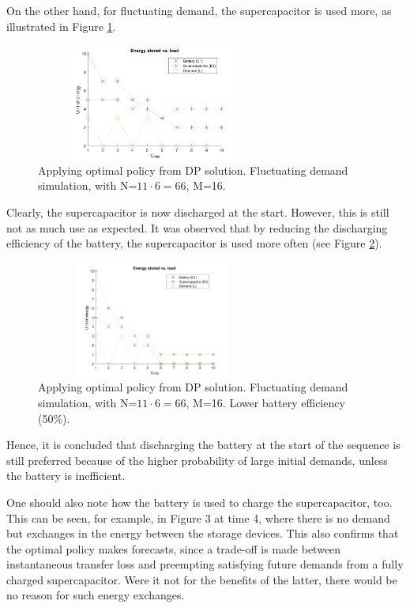 \documentclass[conference]{IEEEtran}
\begin{document}
On the other hand, for fluctuating demand, the supercapacitor is used more, as illustrated in Figure \ref{fig:FluctuatingDemand}.
\begin{figure}[htbp]
\centerline{\includegraphics[width=3in,height=1.5in]{EnergyStoredvsFluctuatingLoad(E1=10,E2=5).jpg}}
\caption{Applying optimal policy from DP solution. Fluctuating demand simulation, with N=$11\cdot6=66$, M=16.}
\label{fig:FluctuatingDemand}
\end{figure} Clearly, the supercapacitor is now discharged at the start. However, this is still not as much use as expected. It was observed that by reducing the discharging efficiency of the battery, the supercapacitor is used more often (see Figure \ref{fig:FluctuatingDemand_LowBattEff}).
\begin{figure}[htbp]
\centerline{\includegraphics[width=3in,height=1.5in]{EnergyStoredvsFluctuatingLoad_LowBattEff(E1=10,E2=5).jpg}}
\caption{Applying optimal policy from DP solution. Fluctuating demand simulation, with N=$11\cdot6=66$, M=16. Lower battery efficiency (50\%).}
\label{fig:FluctuatingDemand_LowBattEff}
\end{figure} Hence, it is concluded that discharging the battery at the start of the sequence is still preferred because of the higher probability of large initial demands, unless the battery is inefficient.

One should also note how the battery is used to charge the supercapacitor, too. This can be seen, for example, in Figure 3 at time 4, where there is no demand but exchanges in the energy between the storage devices. This also confirms that the optimal policy makes forecasts, since a trade-off is made between instantaneous transfer loss and preempting satisfying future demands from a fully charged supercapacitor. Were it not for the benefits of the latter, there would be no reason for such energy exchanges.
\end{document}

